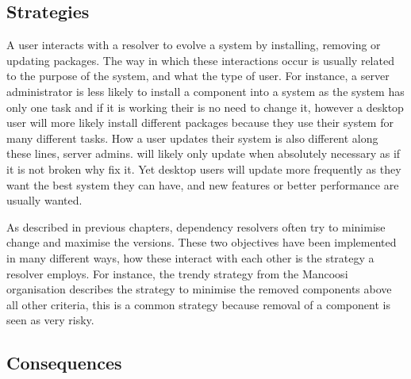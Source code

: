 

\subsection{Strategies}
A user interacts with a resolver to evolve a system by installing, removing or updating packages.
The way in which these interactions occur is usually related to the purpose of the system, and what the type of user.
For instance, a server administrator is less likely to install a component into a system as the system has only one task and if it is working their is no need to change it, 
however a desktop user will more likely install different packages because they use their system for many different tasks.
How a user updates their system is also different along these lines, server admins. will likely only update when absolutely necessary as if it is not broken why fix it.
Yet desktop users will update more frequently as they want the best system they can have, and new features or better performance are usually wanted.

As described in previous chapters, dependency resolvers often try to minimise change and maximise the versions.
These two objectives have been implemented in many different ways, how these interact with each other is the strategy a resolver employs.
For instance, the trendy strategy from the Mancoosi organisation describes the strategy to minimise the removed components above all other criteria,
this is a common strategy because removal of a component is seen as very risky.

\subsection{Consequences}




